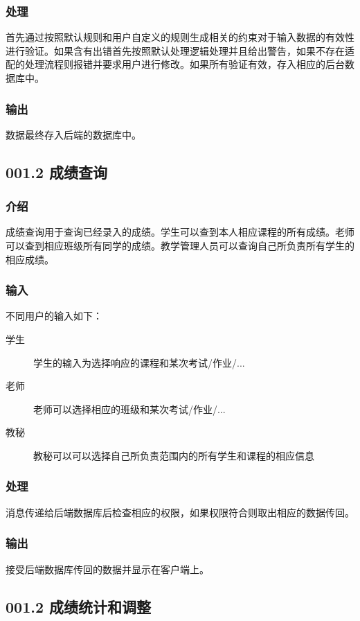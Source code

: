     \subsubsection{处理}
    首先通过按照默认规则和用户自定义的规则生成相关的约束对于输入数据的有效性进行验证。如果含有出错首先按照默认处理逻辑处理并且给出警告，如果不存在适配的处理流程则报错并要求用户进行修改。如果所有验证有效，存入相应的后台数据库中。
    \subsubsection{输出}
    数据最终存入后端的数据库中。

  \subsection{001.2 成绩查询}
    \subsubsection{介绍}
    成绩查询用于查询已经录入的成绩。学生可以查到本人相应课程的所有成绩。老师可以查到相应班级所有同学的成绩。教学管理人员可以查询自己所负责所有学生的相应成绩。
    \subsubsection{输入}
    不同用户的输入如下：
    \begin{center}\begin{description}
      \item[学生] 学生的输入为选择响应的课程和某次考试/作业/...
      \item[老师] 老师可以选择相应的班级和某次考试/作业/...
      \item[教秘] 教秘可以可以选择自己所负责范围内的所有学生和课程的相应信息
    \end{description}\end{center}
    \subsubsection{处理}
    消息传递给后端数据库后检查相应的权限，如果权限符合则取出相应的数据传回。
    \subsubsection{输出}
    接受后端数据库传回的数据并显示在客户端上。

  \subsection{001.2 成绩统计和调整}

